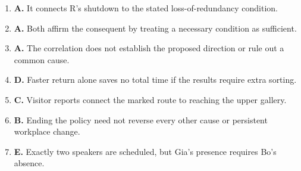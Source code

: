 \begin{enumerate}
\item \textbf{A.} It connects R's shutdown to the stated loss-of-redundancy condition.
\item \textbf{A.} Both affirm the consequent by treating a necessary condition as sufficient.
\item \textbf{A.} The correlation does not establish the proposed direction or rule out a common cause.
\item \textbf{D.} Faster return alone saves no total time if the results require extra sorting.
\item \textbf{C.} Visitor reports connect the marked route to reaching the upper gallery.
\item \textbf{B.} Ending the policy need not reverse every other cause or persistent workplace change.
\item \textbf{E.} Exactly two speakers are scheduled, but Gia's presence requires Bo's absence.
\end{enumerate}

